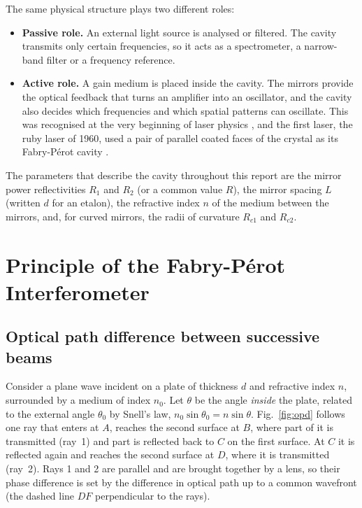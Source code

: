 \documentclass[11pt,a4paper]{article}
\newcommand{\FP}{Fabry-P\'erot}
\begin{document}
	The same physical structure plays two different roles:
	\begin{itemize}
		\item \textbf{Passive role.} An external light source is analysed or filtered. The cavity transmits only certain frequencies, so it acts as a spectrometer, a narrow-band filter or a frequency reference.
		\item \textbf{Active role.} A gain medium is placed inside the cavity. The mirrors provide the optical feedback that turns an amplifier into an oscillator, and the cavity also decides which frequencies and which spatial patterns can oscillate. This was recognised at the very beginning of laser physics \cite{SchawlowTownes1958}, and the first laser, the ruby laser of 1960, used a pair of parallel coated faces of the crystal as its \FP{} cavity \cite{Maiman1960}.
	\end{itemize}
	
	The parameters that describe the cavity throughout this report are the mirror power reflectivities $R_1$ and $R_2$ (or a common value $R$), the mirror spacing $L$ (written $d$ for an etalon), the refractive index $n$ of the medium between the mirrors, and, for curved mirrors, the radii of curvature $R_{c1}$ and $R_{c2}$.
	
	\section{Principle of the \FP{} Interferometer}
	
	\subsection{Optical path difference between successive beams}
	
	Consider a plane wave incident on a plate of thickness $d$ and refractive index $n$, surrounded by a medium of index $n_0$. Let $\theta$ be the angle \emph{inside} the plate, related to the external angle $\theta_0$ by Snell's law, $n_0\sin\theta_0=n\sin\theta$. Fig.~\ref{fig:opd} follows one ray that enters at $A$, reaches the second surface at $B$, where part of it is transmitted (ray~1) and part is reflected back to $C$ on the first surface. At $C$ it is reflected again and reaches the second surface at $D$, where it is transmitted (ray~2). Rays 1 and 2 are parallel and are brought together by a lens, so their phase difference is set by the difference in optical path up to a common wavefront (the dashed line $DF$ perpendicular to the rays).
	
\end{document}
